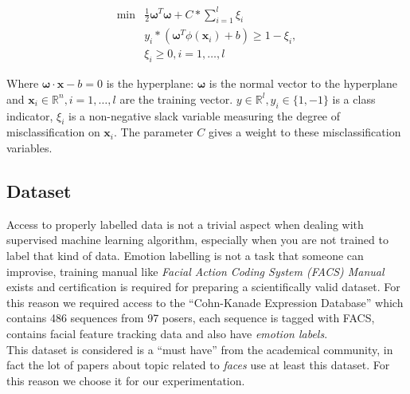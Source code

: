  \begin{align}
   \min & \frac{1}{2} \boldsymbol{\omega}^T \boldsymbol{\omega} + C*\sum_{i=1}^l \xi_i\\
   & y_i * (\boldsymbol{\omega}^T \phi(\textbf{x}_i) + b) \geq 1 - \xi_i,\\
   & \xi_i \geq 0, i = 1, \dots, l
   \label{mt:lin_svm}
 \end{align}
 
 Where $\boldsymbol{\omega} \cdot \textbf{x} - b = 0$ is the hyperplane:
 $\boldsymbol{\omega}$ is the normal vector to the hyperplane and $\textbf{x}_i
 \in \mathbb{R}^n, i = 1,\dots,l$ are the training vector.  $y \in \mathbb{R}^l,
 y_i \in \{1, -1\}$ is a class indicator, $\xi_i$ is a non-negative slack
 variable measuring the degree of misclassification on $\textbf{x}_i$. The
 parameter $C$ gives a weight to these misclassification variables.

\subsection{Dataset}

Access to properly labelled data is not a trivial aspect when dealing with supervised machine learning algorithm, especially when you are not trained to label that kind of data. Emotion labelling is not a task that someone can improvise, training manual like \emph{Facial Action Coding System (FACS) Manual} exists and certification is required for preparing a scientifically valid dataset. For this reason we required access to the ``Cohn-Kanade Expression Database''\cite{Kanade2000} which contains 486 sequences from 97 posers, each sequence is tagged with FACS, contains facial feature tracking data and also have \emph{emotion labels}. \\

This dataset is considered is a ``must have'' from the academical community, in fact the lot of papers about topic related to \emph{faces} use at least this dataset. For this reason we choose it for our experimentation. 


